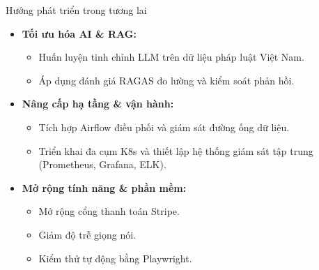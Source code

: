 \begin{frame}{Hướng phát triển trong tương lai}
\begin{itemize}
\item \textbf{Tối ưu hóa AI \& RAG:}
\begin{itemize}
\item Huấn luyện tinh chỉnh LLM trên dữ liệu pháp luật Việt Nam.
\item Áp dụng đánh giá RAGAS đo lường và kiểm soát phản hồi.
\end{itemize}
\item \textbf{Nâng cấp hạ tầng \& vận hành:}
\begin{itemize}
\item Tích hợp Airflow điều phối và giám sát đường ống dữ liệu.
\item Triển khai đa cụm K8s và thiết lập hệ thống giám sát tập trung (Prometheus, Grafana, ELK).
\end{itemize}
\item \textbf{Mở rộng tính năng \& phần mềm:}
\begin{itemize}
\item Mở rộng cổng thanh toán Stripe.
\item Giảm độ trễ giọng nói.
\item Kiểm thử tự động bằng Playwright.
\end{itemize}
\end{itemize}

\end{frame}

